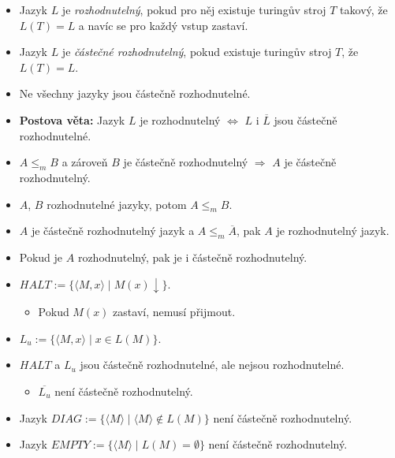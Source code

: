\documentclass{article}
\theoremstyle{plain}
\theoremstyle{plain}
\theoremstyle{remark}
\begin{document}
\begin{itemize}
  \item Jazyk $L$ je \emph{rozhodnutelný}, pokud pro něj existuje turingův
  stroj $T$ takový, že $L(T) = L$ a navíc se pro každý vstup zastaví.

  \item Jazyk $L$ je \emph{částečné rozhodnutelný}, pokud existuje turingův
  stroj $T$, že $L(T) = L$.

  \item Ne všechny jazyky jsou částečně rozhodnutelné.

  \item \textbf{Postova věta:} Jazyk $L$ je rozhodnutelný $\Leftrightarrow$
  $L$ i $\overline{L}$ jsou částečně rozhodnutelné.

  \item $A \leq_m B$ a zároveň $B$ je částečně rozhodnutelný $\Rightarrow$
  $A$ je částečně rozhodnutelný.

  \item $A$, $B$ rozhodnutelné jazyky, potom $A \leq_m B$.

  \item $A$ je částečně rozhodnutelný jazyk a $A \leq_m \overline{A}$,
  pak $A$ je rozhodnutelný jazyk.

  \item Pokud je $A$ rozhodnutelný, pak je i částečně rozhodnutelný.

  \item $HALT := \{\langle M, x \rangle \mid M(x) \downarrow \}$.
  \begin{itemize}
    \item Pokud $M(x)$ zastaví, nemusí přijmout.
  \end{itemize}

  \item $L_u := \{\langle M, x \rangle \mid x \in L(M)\}$.

  \item $HALT$ a $L_u$ jsou částečně rozhodnutelné, ale nejsou rozhodnutelné.
  \begin{itemize}
    \item $\overline{L_u}$ není částečně rozhodnutelný.
  \end{itemize}

  \item Jazyk $DIAG := \{\langle M \rangle \mid \langle M \rangle \notin L(M)\}$
  není částečně rozhodnutelný.

  \item Jazyk $EMPTY := \{\langle M \rangle \mid L(M) = \emptyset\}$ není
  částečně rozhodnutelný.


\end{itemize}
\end{document}
